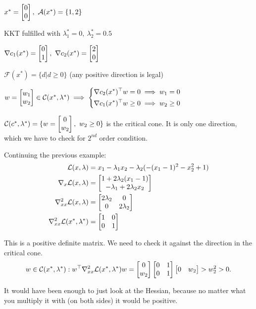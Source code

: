 \documentclass{article}
\begin{document}
\begin{minipage}[c]{0.4\textwidth}
\end{minipage}
\begin{minipage}[c]{0.6\textwidth}
  $x^* = \begin{bmatrix} 0 \\ 0 \end{bmatrix},\ \mathcal{A}(x^*) = \{1,2\}$
  
  \medskip KKT fulfilled with $\lambda_1^* = 0,\ \lambda_2^* = 0.5$
  
  \medskip $\nabla c_1(x^*) = \begin{bmatrix} 0 \\ 1 \end{bmatrix},\ \nabla c_2(x^*) = \begin{bmatrix} 2 \\ 0 \end{bmatrix}$
  
  \medskip $\mathcal{F}(x^*) = \{d | d \geq 0\}$ (any positive direction is legal)
  
\end{minipage}

$w = \begin{bmatrix} w_1 \\ w_2 \end{bmatrix}\in \mathcal{C}(x^*, \lambda ^*) \implies \left\{
  \begin{aligned}
    \nabla c_2(x^*)^{\top}w &= 0 \implies w_1 = 0 \\
    \nabla c_1(x^*)^{\top}w &\geq 0 \implies w_2 \geq 0 
  \end{aligned}
\right.$

\medskip $\mathcal{C}(c^*, \lambda^*) = \{w = \begin{bmatrix} 0 \\ w_2 \end{bmatrix},\  w_2 \geq 0\}$ is the critical cone. It is only one 
direction, which we have to check for $2^{nd}$ order condition.  


Continuing the previous example:
\begin{align*}
   \mathcal{L}(x, \lambda) &= x_1 - \lambda_1x_2-\lambda_2(-(x_1-1)^2-x_2^2+1) \\
   \nabla_x\mathcal{L}(x, \lambda) &= \begin{bmatrix} 1 + 2\lambda_2(x_1-1) \\ -\lambda_1 + 2\lambda_2x_2 \end{bmatrix} \\
   \nabla_{xx}^2\mathcal{L}(x, \lambda) &= \begin{bmatrix} 2\lambda_2 & 0 \\ 0 & 2\lambda_2 \end{bmatrix} \\
   \nabla_{xx}^2\mathcal{L}(x^*, \lambda^*) &= \begin{bmatrix} 1 & 0 \\ 0 & 1 \end{bmatrix}
\end{align*}

This is a positive definite matrix. We need to check it against the direction in the critical cone. 
\[
  w \in\mathcal{C}(x^*, \lambda^*) : w^{\top}\nabla_{xx}^2\mathcal{L}(x^*, \lambda^*)w = \begin{bmatrix} 0 \\ w_2 \end{bmatrix}\begin{bmatrix} 0 & 1 \\ 0 & 1 \end{bmatrix}\begin{bmatrix} 0 & w_2 \end{bmatrix} > w_2^2 > 0
.\] 

It would have been enough to just look at the Hessian, because no matter what you multiply it with (on both sides) 
it would be positive. 
\end{document}
